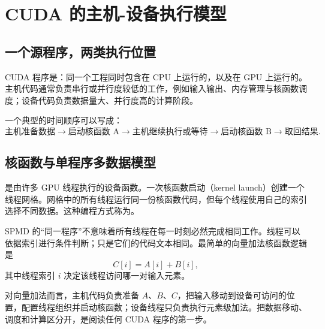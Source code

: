 \section{CUDA 的主机-设备执行模型}

\subsection{一个源程序，两类执行位置}

CUDA 程序是：同一个工程同时包含在 CPU 上运行的，以及在 GPU 上运行的。主机代码通常负责串行或并行度较低的工作，例如输入输出、内存管理与核函数调度；设备代码负责数据量大、并行度高的计算阶段。


一个典型的时间顺序可以写成：
\[
\text{主机准备数据}
\rightarrow
\text{启动核函数 A}
\rightarrow
\text{主机继续执行或等待}
\rightarrow
\text{启动核函数 B}
\rightarrow
\text{取回结果}.
\]

\subsection{核函数与单程序多数据模型}

是由许多 GPU 线程执行的设备函数。一次核函数启动（kernel launch）创建一个线程网格。网格中的所有线程运行同一份核函数代码，但每个线程使用自己的索引选择不同数据。这种编程方式称为。

SPMD 的“同一程序”不意味着所有线程在每一时刻必然完成相同工作。线程可以依据索引进行条件判断；只是它们的代码文本相同。最简单的向量加法核函数逻辑是
\[
C[i]=A[i]+B[i],
\]
其中线程索引 $i$ 决定该线程访问哪一对输入元素。

\begin{examplebox}[title={主机与设备的职责边界}]
对向量加法而言，主机代码负责准备 $A$、$B$、$C$，把输入移动到设备可访问的位置，配置线程组织并启动核函数；设备线程只负责执行元素级加法。把数据移动、调度和计算区分开，是阅读任何 CUDA 程序的第一步。
\end{examplebox}
